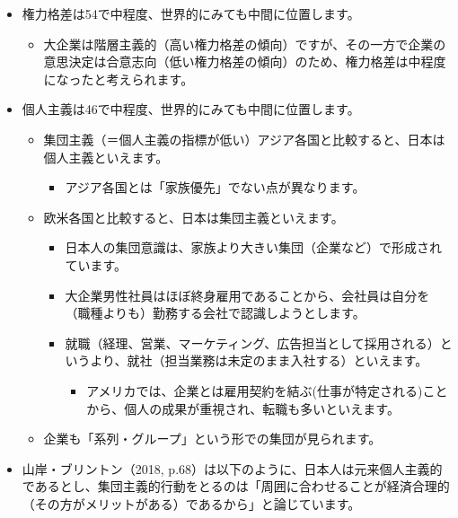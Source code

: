 \documentclass[
]{book}
\providecommand{\tightlist}{%
  \setlength{\itemsep}{0pt}\setlength{\parskip}{0pt}}
\begin{document}
\begin{itemize}
\item
  権力格差は54で中程度、世界的にみても中間に位置します。

  \begin{itemize}
  \tightlist
  \item
    大企業は階層主義的（高い権力格差の傾向）ですが、その一方で企業の意思決定は合意志向（低い権力格差の傾向）のため、権力格差は中程度になったと考えられます。
  \end{itemize}
\item
  個人主義は46で中程度、世界的にみても中間に位置します。

  \begin{itemize}
  \item
    集団主義（＝個人主義の指標が低い）アジア各国と比較すると、日本は個人主義といえます。

    \begin{itemize}
    \tightlist
    \item
      アジア各国とは「家族優先」でない点が異なります。
    \end{itemize}
  \item
    欧米各国と比較すると、日本は集団主義といえます。

    \begin{itemize}
    \item
      日本人の集団意識は、家族より大きい集団（企業など）で形成されています。
    \item
      大企業男性社員はほぼ終身雇用であることから、会社員は自分を（職種よりも）勤務する会社で認識しようとします。
    \item
      就職（経理、営業、マーケティング、広告担当として採用される）というより、就社（担当業務は未定のまま入社する）といえます。

      \begin{itemize}
      \tightlist
      \item
        アメリカでは、企業とは雇用契約を結ぶ(仕事が特定される)ことから、個人の成果が重視され、転職も多いといえます。
      \end{itemize}
    \end{itemize}
  \item
    企業も「系列・グループ」という形での集団が見られます。
  \end{itemize}
\item
  山岸・ブリントン（2018, p.68）は以下のように、日本人は元来個人主義的であるとし、集団主義的行動をとるのは「周囲に合わせることが経済合理的（その方がメリットがある）であるから」と論じています。
\end{itemize}
\end{document}
